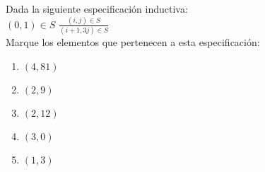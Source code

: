 {
Dada la siguiente especificación inductiva:\\
$(0,1) \in S$  $\frac{(i,j) \in S}{(i+1,3j) \in S}$ \\ 
Marque los elementos que pertenecen a esta especificación:
\begin{enumerate}
\item $(4,81)$ %
\item $(2,9)$ %
\item $(2,12)$
\item $(3,0)$
\item $(1,3)$  %
\end{enumerate}
}
